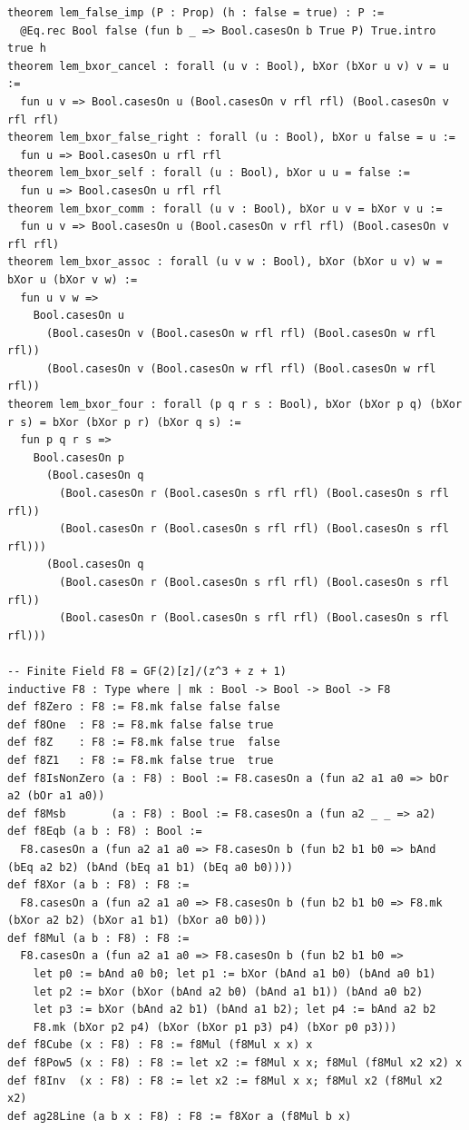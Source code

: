 \documentclass[11pt,letterpaper]{article}
\theoremstyle{spectralthm}
\begin{document}
\begin{lstlisting}[language=Lean4,caption={Standalone Pure Init.Prelude Term-Mode Lean 4 Kernel Suite (thm30--thm61, v0.0.0, 0 sorry, 0 axioms).},label={lst:lean_unified}]
theorem lem_false_imp (P : Prop) (h : false = true) : P :=
  @Eq.rec Bool false (fun b _ => Bool.casesOn b True P) True.intro true h
theorem lem_bxor_cancel : forall (u v : Bool), bXor (bXor u v) v = u :=
  fun u v => Bool.casesOn u (Bool.casesOn v rfl rfl) (Bool.casesOn v rfl rfl)
theorem lem_bxor_false_right : forall (u : Bool), bXor u false = u :=
  fun u => Bool.casesOn u rfl rfl
theorem lem_bxor_self : forall (u : Bool), bXor u u = false :=
  fun u => Bool.casesOn u rfl rfl
theorem lem_bxor_comm : forall (u v : Bool), bXor u v = bXor v u :=
  fun u v => Bool.casesOn u (Bool.casesOn v rfl rfl) (Bool.casesOn v rfl rfl)
theorem lem_bxor_assoc : forall (u v w : Bool), bXor (bXor u v) w = bXor u (bXor v w) :=
  fun u v w =>
    Bool.casesOn u
      (Bool.casesOn v (Bool.casesOn w rfl rfl) (Bool.casesOn w rfl rfl))
      (Bool.casesOn v (Bool.casesOn w rfl rfl) (Bool.casesOn w rfl rfl))
theorem lem_bxor_four : forall (p q r s : Bool), bXor (bXor p q) (bXor r s) = bXor (bXor p r) (bXor q s) :=
  fun p q r s =>
    Bool.casesOn p
      (Bool.casesOn q
        (Bool.casesOn r (Bool.casesOn s rfl rfl) (Bool.casesOn s rfl rfl))
        (Bool.casesOn r (Bool.casesOn s rfl rfl) (Bool.casesOn s rfl rfl)))
      (Bool.casesOn q
        (Bool.casesOn r (Bool.casesOn s rfl rfl) (Bool.casesOn s rfl rfl))
        (Bool.casesOn r (Bool.casesOn s rfl rfl) (Bool.casesOn s rfl rfl)))

-- Finite Field F8 = GF(2)[z]/(z^3 + z + 1)
inductive F8 : Type where | mk : Bool -> Bool -> Bool -> F8
def f8Zero : F8 := F8.mk false false false
def f8One  : F8 := F8.mk false false true
def f8Z    : F8 := F8.mk false true  false
def f8Z1   : F8 := F8.mk false true  true
def f8IsNonZero (a : F8) : Bool := F8.casesOn a (fun a2 a1 a0 => bOr a2 (bOr a1 a0))
def f8Msb       (a : F8) : Bool := F8.casesOn a (fun a2 _ _ => a2)
def f8Eqb (a b : F8) : Bool :=
  F8.casesOn a (fun a2 a1 a0 => F8.casesOn b (fun b2 b1 b0 => bAnd (bEq a2 b2) (bAnd (bEq a1 b1) (bEq a0 b0))))
def f8Xor (a b : F8) : F8 :=
  F8.casesOn a (fun a2 a1 a0 => F8.casesOn b (fun b2 b1 b0 => F8.mk (bXor a2 b2) (bXor a1 b1) (bXor a0 b0)))
def f8Mul (a b : F8) : F8 :=
  F8.casesOn a (fun a2 a1 a0 => F8.casesOn b (fun b2 b1 b0 =>
    let p0 := bAnd a0 b0; let p1 := bXor (bAnd a1 b0) (bAnd a0 b1)
    let p2 := bXor (bXor (bAnd a2 b0) (bAnd a1 b1)) (bAnd a0 b2)
    let p3 := bXor (bAnd a2 b1) (bAnd a1 b2); let p4 := bAnd a2 b2
    F8.mk (bXor p2 p4) (bXor (bXor p1 p3) p4) (bXor p0 p3)))
def f8Cube (x : F8) : F8 := f8Mul (f8Mul x x) x
def f8Pow5 (x : F8) : F8 := let x2 := f8Mul x x; f8Mul (f8Mul x2 x2) x
def f8Inv  (x : F8) : F8 := let x2 := f8Mul x x; f8Mul x2 (f8Mul x2 x2)
def ag28Line (a b x : F8) : F8 := f8Xor a (f8Mul b x)


\end{lstlisting}
\end{document}
